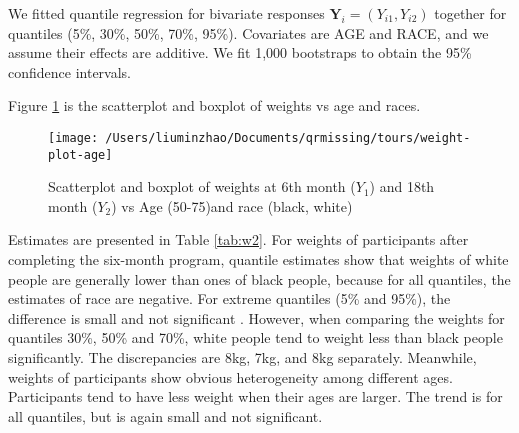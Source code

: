 \documentclass[12pt]{article}
\begin{document}
We fitted quantile regression for bivariate responses $\bm Y_i =
(Y_{i1}, Y_{i2})$ together for quantiles (5\%, 30\%, 50\%, 70\%,
95\%). Covariates are AGE and RACE, and we assume their effects are
additive.  We fit 1,000 bootstraps to obtain the 95\% confidence
intervals.

Figure \ref{fig:tours} is the scatterplot and boxplot of weights vs
age and races.

\begin{figure}[htb]
  \centerline{\texttt{[image: /Users/liuminzhao/Documents/qrmissing/tours/weight-plot-age]}}
  \caption[]{\label{fig:tours} Scatterplot and boxplot of weights at
    6th month ($Y_1$) and 18th month ($Y_2$) vs Age (50-75)and race
    (black, white)}
\end{figure}

Estimates are presented in Table \ref{tab:w2}. For weights of
participants after completing the six-month program, quantile
estimates show that weights of white people are generally lower than
ones of black people, because for all quantiles, the estimates of race
are negative. For extreme quantiles (5\% and 95\%), the difference is
small and not significant . However, when comparing the weights for
quantiles 30\%, 50\% and 70\%, white people tend to weight less
 than black people significantly. The discrepancies are 8kg, 7kg, and
8kg separately. Meanwhile, weights of participants show obvious
heterogeneity among different ages. Participants tend to have less
weight when their ages are larger. The trend is for all quantiles, but
is again small and not significant.
\end{document}
